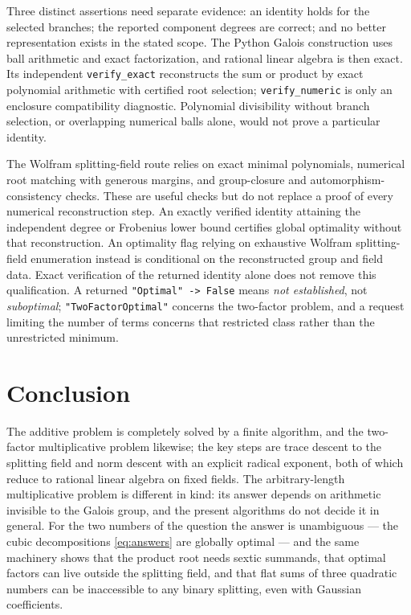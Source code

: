 \documentclass[11pt,a4paper]{article}
\theoremstyle{definition}
\theoremstyle{remark}
\newcommand{\code}[1]{\texttt{#1}}
\begin{document}
Three distinct assertions need separate evidence: an identity holds for the selected branches; the
reported component degrees are correct; and no better representation exists in the stated scope.
The Python Galois construction uses ball arithmetic and exact factorization, and rational linear
algebra is then exact.  Its independent \code{verify\_exact} reconstructs the sum or product by exact
polynomial arithmetic with certified root selection; \code{verify\_numeric} is only an enclosure
compatibility diagnostic.  Polynomial divisibility without branch selection, or overlapping
numerical balls alone, would not prove a particular identity.

The Wolfram splitting-field route relies on exact minimal polynomials, numerical root matching with
generous margins, and group-closure and automorphism-consistency checks.  These are useful checks but
do not replace a proof of every numerical reconstruction step.  An exactly verified identity attaining
the independent degree or Frobenius lower bound certifies global optimality without that reconstruction.
An optimality flag relying on exhaustive Wolfram splitting-field enumeration instead is conditional
on the reconstructed group and field data.  Exact verification of the returned identity alone does not
remove this qualification.  A returned \code{"Optimal" -> False} means \emph{not established}, not
\emph{suboptimal}; \code{"TwoFactorOptimal"} concerns the two-factor problem, and a request limiting
the number of terms concerns that restricted class rather than the unrestricted minimum.

\section{Conclusion}

The additive problem is completely solved by a finite algorithm, and the two-factor multiplicative
problem likewise; the key steps are trace descent to the splitting field and norm descent with an
explicit radical exponent, both of which reduce to rational linear algebra on fixed fields.  The
arbitrary-length multiplicative problem is different in kind: its answer depends on arithmetic
invisible to the Galois group, and the present algorithms do not decide it in general.  For the two numbers of the question the
answer is unambiguous --- the cubic decompositions \eqref{eq:answers} are globally optimal --- and the
same machinery shows that the product root needs sextic summands, that optimal factors can live outside
the splitting field, and that flat sums of three quadratic numbers can be inaccessible to any binary
splitting, even with Gaussian coefficients.
\end{document}
